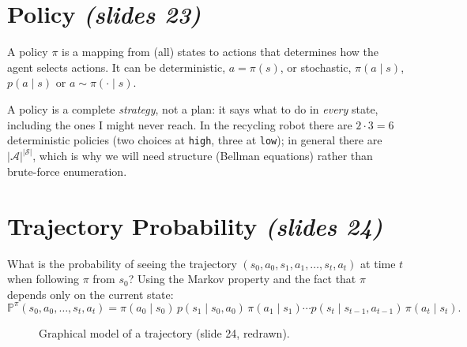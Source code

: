 \documentclass[11pt,a4paper]{article}
\newcommand{\PP}{\mathbb{P}}
\newcommand{\cS}{\mathcal{S}}
\newcommand{\cA}{\mathcal{A}}
\newcommand{\slr}[1]{\texorpdfstring{\emph{(slides #1)}}{(slides #1)}}
\theoremstyle{plain}
\theoremstyle{definition}
\theoremstyle{remark}
\begin{document}
\section{Policy \slr{23}}
A policy $\pi$ is a mapping from (all) states to actions that determines how the agent selects actions. It can be deterministic, $a=\pi(s)$, or stochastic, $\pi(a\mid s)$, $p(a\mid s)$ or $a\sim\pi(\cdot\mid s)$.

\begin{intuition}
A policy is a complete \emph{strategy}, not a plan: it says what to do in \emph{every} state, including the ones I might never reach. In the recycling robot there are $2\cdot3=6$ deterministic policies (two choices at \texttt{high}, three at \texttt{low}); in general there are $|\cA|^{|\cS|}$, which is why we will need structure (Bellman equations) rather than brute-force enumeration.
\end{intuition}

\section{Trajectory Probability \slr{24}}
What is the probability of seeing the trajectory $(s_0,a_0,s_1,a_1,\dots,s_t,a_t)$ at time $t$ when following $\pi$ from $s_0$? Using the Markov property and the fact that $\pi$ depends only on the current state:
\[
  \PP^\pi(s_0,a_0,\dots,s_t,a_t)=\pi(a_0\mid s_0)\,p(s_1\mid s_0,a_0)\,\pi(a_1\mid s_1)\cdots p(s_t\mid s_{t-1},a_{t-1})\,\pi(a_t\mid s_t).
\]

\begin{figure}[htbp]
\centering
{}
\caption{Graphical model of a trajectory (slide 24, redrawn).}
\end{figure}
\end{document}

